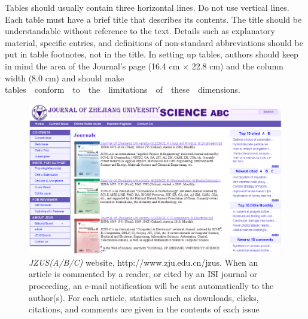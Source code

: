 \documentclass[twoside,twocolumn]{article}
\begin{document}
Tables should usually contain three horizontal lines. Do not use vertical lines. Each table must have a brief title that describes its contents. The title should be understandable without reference to the text. Details such as explanatory material, specific entries, and definitions of non-standard abbreviations should be put in table footnotes, not in the title. In setting up tables, authors should keep in mind the area of the Journal's page (16.4 cm $\times$ 22.8 cm) and the column width (8.0 cm) and should make tables\ \ conform\ \ to\ \ the\ \ limitations\ \ of\ \ these\ \ dimensions.

\begin{figure}[tbh]
\centering
	\includegraphics[scale=1.0]{pics/website.eps}
	\caption{\emph{JZUS(A/B/C)} website, http://www.zju.edu.cn/jzus. When an article is commented by a reader, or cited by an ISI journal or proceeding, an e-mail notification will be sent automatically to the author(s). For each article, statistics such as downloads, clicks, citations, and comments are given in the contents of each issue} 
	\label{fig:website}
\end{figure}
\end{document}
